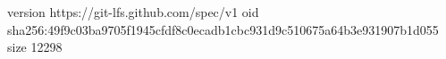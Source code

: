 version https://git-lfs.github.com/spec/v1
oid sha256:49f9c03ba9705f1945cfdf8c0ecadb1cbc931d9c510675a64b3e931907b1d055
size 12298
